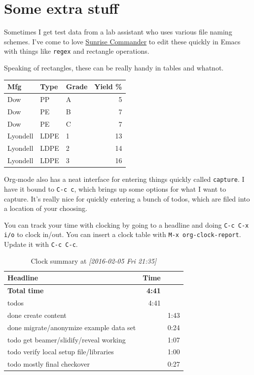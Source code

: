\documentclass[11pt]{article}
\begin{document}
\section*{Some extra stuff}
\label{sec:orgheadline11}

Sometimes I get test data from a lab assistant who uses various file naming schemes. I've
come to love \href{http://www.emacswiki.org/emacs/Sunrise_Commander}{Sunrise Commander} to edit these quickly in Emacs with things like \texttt{regex} and
rectangle operations.

Speaking of rectangles, these can be really handy in tables and whatnot.

\begin{center}
\begin{tabular}{lllr}
\toprule
\textbf{Mfg} & \textbf{Type} & \textbf{Grade} & \textbf{Yield \%}\\
\midrule
Dow & PP & A & 5\\
Dow & PE & B & 7\\
Dow & PE & C & 7\\
Lyondell & LDPE & 1 & 13\\
Lyondell & LDPE & 2 & 14\\
Lyondell & LDPE & 3 & 16\\
\bottomrule
\end{tabular}
\end{center}


Org-mode also has a neat interface for entering things quickly called \texttt{capture}. I have it
bound to \texttt{C-c c}, which brings up some options for what I want to capture. It's really
nice for quickly entering a bunch of todos, which are filed into a location of your
choosing.

You can track your time with clocking by going to a headline and doing \texttt{C-c C-x i/o} to
clock in/out. You can insert a clock table with \texttt{M-x org-clock-report}. Update it with
\texttt{C-c C-c}.

\begin{table}[htb]
\caption{Clock summary at \textit{[2016-02-05 Fri 21:35]}}
\centering
\begin{tabular}{lrr}
\toprule
Headline & Time & \\
\midrule
\textbf{Total time} & \textbf{4:41} & \\
\midrule
todos & 4:41 & \\
\hspace*{1.0em}done create content &  & 1:43\\
\hspace*{1.0em}done migrate/anonymize example data set &  & 0:24\\
\hspace*{1.0em}todo get beamer/slidify/reveal working &  & 1:07\\
\hspace*{1.0em}todo verify local setup file/libraries &  & 1:00\\
\hspace*{1.0em}todo mostly final checkover &  & 0:27\\
\bottomrule
\end{tabular}
\end{table}
\end{document}

